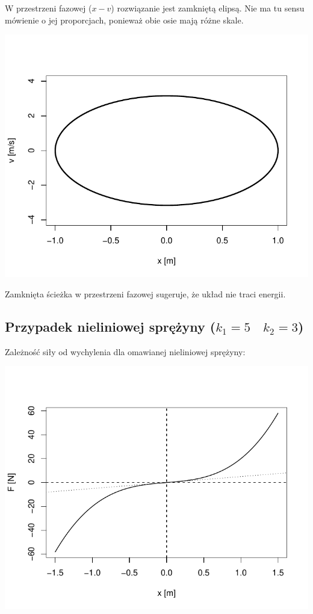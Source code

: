 \documentclass[12pt]{sprawozdanie}
\begin{document}
W przestrzeni fazowej (\(x-v\)) rozwiązanie jest zamkniętą elipsą. Nie
ma tu sensu mówienie o jej proporcjach, ponieważ obie osie mają różne
skale.

\begin{center}\includegraphics{info2_files/figure-latex/linear-phase-space-1} \end{center}

Zamknięta ścieżka w przestrzeni fazowej sugeruje, że układ nie traci
energii.

\hypertarget{przypadek-nieliniowej-sprezyny-k_15quad-k_23}{%
\subsection{\texorpdfstring{Przypadek nieliniowej sprężyny
(\(k_1=5\quad k_2=3\))}{Przypadek nieliniowej sprężyny (k\_1=5\textbackslash{}quad k\_2=3)}}\label{przypadek-nieliniowej-sprezyny-k_15quad-k_23}}

Zależność siły od wychylenia dla omawianej nieliniowej sprężyny:

\begin{center}\includegraphics{info2_files/figure-latex/nonlinear-characteristic-1} \end{center}
\end{document}

